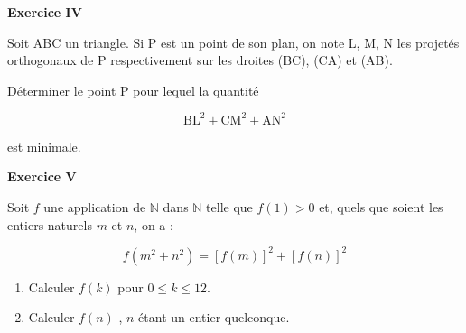 \documentclass[a4paper,11pt]{article}
\newcommand{\N}{\mathbb{N}}
\begin{document}
\begin{center}\textbf{{\color{blue} Exercice IV}}
\end{center}

Soit ABC un triangle. Si P est un point de son plan, on note L, M, N les projetés orthogonaux de P respectivement sur les droites (BC), (CA) et (AB). 

Déterminer le point P pour lequel la quantité 

\[\text{BL}^2  + \text{CM}^2 + \text{AN}^2\]

est minimale.


\begin{center}\textbf{{\color{blue} Exercice V}}
\end{center}

Soit $f$ une application de $\N$ dans $\N$ telle que $f(1) > 0$ et, quels que soient les entiers naturels $m$ et $n$, on a :

\[f\left(m^2 + n^2\right) = [f(m)]^2 + [f(n)]^2\]

\begin{enumerate}
\item Calculer $f (k)$ pour $0 \leqslant k \leqslant 12$.
\item Calculer $f(n)$ , $n$ étant un entier quelconque.
\end{enumerate}
\end{document}
